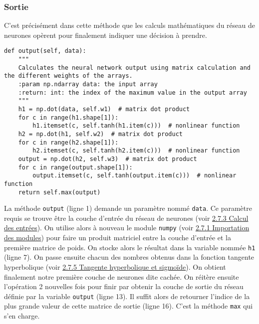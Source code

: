 \documentclass[12pt, a4paper, openany]{book}
\begin{document}
\subsubsection{Sortie}
\label{r:2.7.5-sor}
C'est précisément dans cette méthode que les calculs mathématiques du réseau de neurones opèrent pour finalement indiquer une décision à prendre.
\begin{verbatim}
def output(self, data):
    """
    Calculates the neural network output using matrix calculation and the different weights of the arrays.
    :param np.ndarray data: the input array
    :return: int: the index of the maximum value in the output array
    """
    h1 = np.dot(data, self.w1)  # matrix dot product
    for c in range(h1.shape[1]):
        h1.itemset(c, self.tanh(h1.item(c)))  # nonlinear function
    h2 = np.dot(h1, self.w2)  # matrix dot product
    for c in range(h2.shape[1]):
        h2.itemset(c, self.tanh(h2.item(c)))  # nonlinear function
    output = np.dot(h2, self.w3)  # matrix dot product
    for c in range(output.shape[1]):
        output.itemset(c, self.tanh(output.item(c)))  # nonlinear function
    return self.max(output)
\end{verbatim}
La méthode \verb'output' (ligne 1) demande un paramètre nommé \verb'data'. Ce paramètre requis se trouve être la couche d'entrée du réseau de neurones (voir \hyperref[r:2.7.3-ent]{2.7.3 Calcul des entrées}). On utilise alors à nouveau le module \verb'numpy' (voir \hyperref[r:2.7.1-imp]{2.7.1 Importation des modules}) pour faire un produit matriciel entre la couche d'entrée et la première matrice de poids. On stocke alors le résultat dans la variable nommée \verb'h1' (ligne 7). On passe ensuite chacun des nombres obtenus dans la fonction tangente hyperbolique (voir \hyperref[r:2.7.5-tan]{2.7.5 Tangente hyperbolique et sigmoïde}). On obtient finalement notre première couche de neurones dite \og{}cachée\fg{}. On réitère ensuite l'opération 2 nouvelles fois pour finir par obtenir la couche de sortie du réseau définie par la variable \verb'output' (ligne 13). Il suffit alors de retourner l'indice de la plus grande valeur de cette matrice de sortie (ligne 16). C'est la méthode \verb'max' qui s'en charge.
\end{document}

